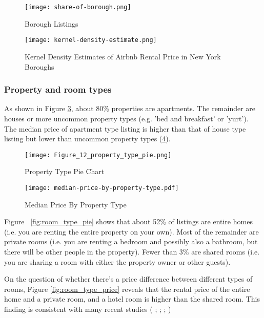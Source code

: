 \begin{figure}[!htbp] \centering
  \texttt{[image: share-of-borough.png]}
    \caption{Borough Listings}
    \label{fig:borough-number-of-listing}
\end{figure}


\begin{figure}[!htbp]\centering
    \texttt{[image: kernel-density-estimate.png]}
    \caption{Kernel Density Estimates of Airbnb Rental Price in New York Boroughs}
    \label{fig:boroughs-kernel-density-estimate}
\end{figure}

\subsubsection*{Property and room types}

As shown in Figure \ref{fig:property_type},
about 80\% properties are apartments. The remainder are houses or more uncommon
property types (e.g. 'bed and breakfast' or 'yurt'). The median price of
apartment type listing is higher than that of house type listing but lower than
uncommon property types (\ref{fig:property_type_price}).

\begin{figure}[!htbp]
    \centering
        \centering
        \caption{Property Type Pie Chart}
        \texttt{[image: Figure\_12\_property\_type\_pie.png]}
      \label{fig:property_type}
\end{figure}

\begin{figure}[!htbp]
        \centering
        \texttt{[image: median-price-by-property-type.pdf]}
        \caption{Median Price By Property Type}
        \label{fig:property_type_price}
\end{figure}

Figure ~\ref{fig:room_type_pie} shows that about 52\% of listings are entire homes
(i.e. you are renting the entire property on your own). Most of the remainder
are private rooms (i.e. you are renting a bedroom and possibly also a bathroom,
but there will be other people in the property). Fewer than 3\% are shared rooms
(i.e. you are sharing a room with either the property owner or other guests).

On the question of whether there's a price difference between different types of
rooms, Figure \ref{fig:room_type_price} reveals that the rental price of the
entire home and a private room, and a hotel room is higher than the shared room.
This finding is consistent with many recent studies (\cite{cai2019price} ;
\cite{benitez2018flexible}; \cite{chen2017consumer}; \cite{gibbs2018use})

